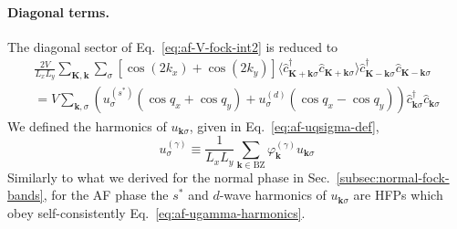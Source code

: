 \paragraph{Diagonal terms.}

The diagonal sector of Eq.~\eqref{eq:af-V-fock-int2} is reduced to
\begin{multline}
	\frac{2V}{L_x L_y} \sum_{\mathbf{K}, \mathbf{k}} \sum_\sigma \left[
	\cos \left(
	2k_x
	\right)	+ \cos \left(
	2k_y
	\right)
	\right] \langle
	\hat c_{\mathbf{K}+\mathbf{k} \sigma}^\dagger
	\hat c_{\mathbf{K}+\mathbf{k} \sigma}
	\rangle
	\hat c_{\mathbf{K}-\mathbf{k} \sigma}^\dagger  \hat c_{\mathbf{K}-\mathbf{k}\sigma} \\
	= V \sum_{\mathbf{k},\sigma} \left(
	u^{(s^*)}_\sigma (\cos q_x + \cos q_y) + u^{(d)}_\sigma (\cos q_x - \cos q_y)
	\right) \hat c_{\mathbf{k} \sigma}^\dagger
	\hat c_{\mathbf{k}\sigma} \label{eq:af-V-fock-int3-diag}
\end{multline}
We defined the harmonics of $u_{\mathbf{k}\sigma}$, given in Eq.~\eqref{eq:af-uqsigma-def},
\begin{equation}\label{eq:af-ugamma-harmonics}
	u^{(\gamma)}_\sigma \equiv \frac{1}{L_x L_y} \sum_{\mathbf{k}\in\mathrm{BZ}} \varphi_\mathbf{k}^{(\gamma)} u_{\mathbf{k}\sigma}
\end{equation}
Similarly to what we derived for the normal phase in Sec.~\ref{subsec:normal-fock-bands}, for the AF phase the $s^*$ and $d$-wave harmonics of $u_{\mathbf{k}\sigma}$ are HFPs which obey self-consistently Eq.~\eqref{eq:af-ugamma-harmonics}.

